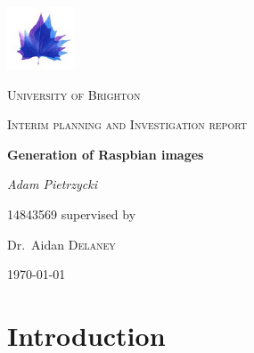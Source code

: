 \documentclass[12pt,a4paper]{report}
\begin{document}
\sloppy
\begin{titlepage}
	\centering
	\includegraphics[width=0.15\textwidth]{Brighton-University-logo.png}\par
	{\scshape\LARGE University of Brighton\par}
	\vspace{1cm}
	{\scshape\Large Interim planning and Investigation report\par}
	\vspace{1.5cm}
	{\huge\bfseries Generation of Raspbian images\par}
	\vspace{2cm}
	{\Large\itshape Adam Pietrzycki\par}14843569
	\vfill
	supervised by\par
	Dr.~Aidan \textsc{Delaney}
	\vfill
	{\large \today\par}
\end{titlepage}

\begin{abstract}
As of the 8th September 2016, in a blog post by raspberry pi founder Eben Upton \citep{blog}, mentions that the ten millionth raspberry pi has just been sold. The official operating system for these devices is called Raspbian, it is a port of Debian which is available as a standalone image or in a 'New Out Of the Box Software' package for beginners. 'NOOBS' is pre-installed on SD cards that can be bought from many retailers, before the images can be burned to the cards they need to be somehow generated. The current method of generating these images can be found on GitHub \citep{pi-gen}, it is a set of shell scripts which from the commits look to be predominantly maintained by a single developer. The problem with this is that if the developer decided to move on and depart from the project it might take some time before someone else understands the code well enough to be able to carry it on; this can be simply described as the 'Bus Factor.' \citep{bus} Since the release of the raspberry pi in February 2012, new tools have been developed and standards decided; so it might be a nice idea to freshen up the current method.      
\end{abstract}

\pagebreak
\tableofcontents
\pagebreak

\chapter{Introduction}
\end{document}
